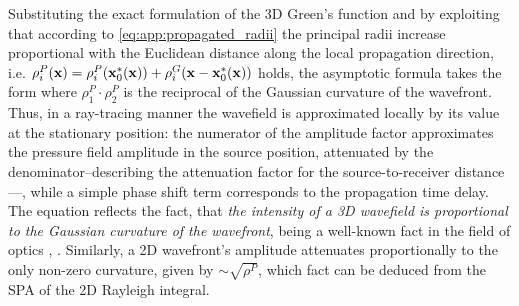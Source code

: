 Substituting the exact formulation of the 3D Green's function %
and by exploiting that according to \eqref{eq:app:propagated_radii} the principal radii increase proportional with the Euclidean distance along the local propagation direction, i.e. $\rho_i^P(\mathbf{x}) = \rho_i^P(\mathbf{x}_0^*(\mathbf{x})) + \rho_i^G(\mathbf{x}-\mathbf{x}_0^*(\mathbf{x}))$ holds, the asymptotic formula takes the form
where $\rho^P_1 \cdot \rho^P_2$ is the reciprocal of the Gaussian curvature of the wavefront.
Thus, in a ray-tracing manner the wavefield is approximated locally by its value at the stationary position: 
the numerator of the amplitude factor approximates the pressure field amplitude in the source position, attenuated by the denominator--describing the attenuation factor for the source-to-receiver distance---, while a simple phase shift term corresponds to the propagation time delay.
The equation reflects the fact, that \emph{the intensity of a 3D wavefield is proportional to the Gaussian curvature of the wavefront}, being a well-known fact in the field of optics \cite[Sec. 3.1]{Born1970}, \cite[Sec. 1.3]{Bouche1997}.
Similarly, a 2D wavefront's amplitude attenuates proportionally to the only non-zero curvature, given by $\sim \sqrt{\rho^P}$, which fact can be deduced from the SPA of the 2D Rayleigh integral.

